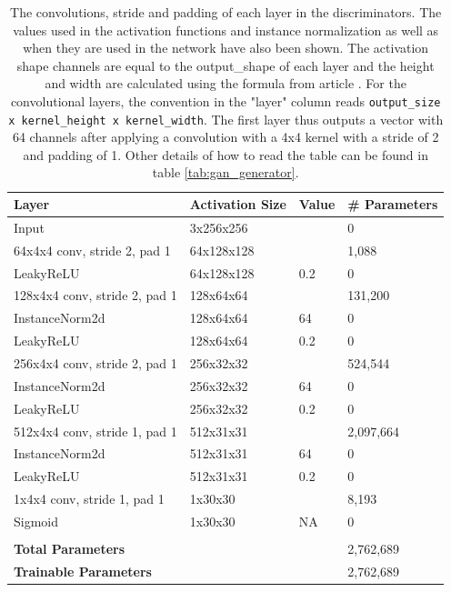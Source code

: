 \documentclass[12pt, fleqn, titlepage]{article}
\begin{document}
\begin{table}[H]
	\centering
	\begin{tabular}{llll}\toprule
		Layer                         & Activation Size & Value & \# Parameters \\ \midrule
		Input                         & 3x256x256       &       & 0             \\
		64x4x4 conv, stride 2, pad 1  & 64x128x128      &       & 1,088         \\
		LeakyReLU                     & 64x128x128      & 0.2   & 0             \\
		128x4x4 conv, stride 2, pad 1 & 128x64x64       &       & 131,200       \\
		InstanceNorm2d                & 128x64x64       & 64    & 0             \\
		LeakyReLU                     & 128x64x64       & 0.2   & 0             \\
		256x4x4 conv, stride 2, pad 1 & 256x32x32       &       & 524,544       \\
		InstanceNorm2d                & 256x32x32       & 64    & 0             \\
		LeakyReLU                     & 256x32x32       & 0.2   & 0             \\
		512x4x4 conv, stride 1, pad 1 & 512x31x31       &       & 2,097,664     \\
		InstanceNorm2d                & 512x31x31       & 64    & 0             \\
		LeakyReLU                     & 512x31x31       & 0.2   & 0             \\
		1x4x4 conv, stride 1, pad 1   & 1x30x30         &       & 8,193         \\
		Sigmoid                       & 1x30x30         & NA    & 0             \\
		                              &                 &       &               \\
		\textbf{Total Parameters}     &                 &       & 2,762,689     \\
		\textbf{Trainable Parameters} &                 &       & 2,762,689     \\ \bottomrule
	\end{tabular}
	\caption{The convolutions, stride and padding of each layer in the discriminators. The values used in the activation functions and instance normalization as well as when they are used in the network have also been shown. The activation shape channels are equal to the output\_shape of each layer and the height and width are calculated using the formula from article \protect\cite{calculate_activation_shape}. For the convolutional layers, the convention in the "layer" column reads \texttt{output\_size x kernel\_height x kernel\_width}. The first layer thus outputs a vector with 64 channels after applying a convolution with a 4x4 kernel with a stride of 2 and padding of 1. Other details of how to read the table can be found in table \ref{tab:gan_generator}.}
	\label{tab:discriminator_layers}
\end{table}
\end{document}
